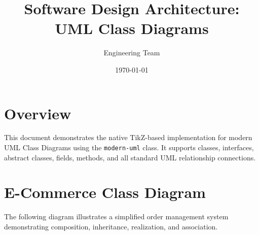 \documentclass{modern-uml}
\title{Software Design Architecture: UML Class Diagrams}
\author{Engineering Team}
\date{\today}
\begin{document}
\maketitle

\section{Overview}
This document demonstrates the native TikZ-based implementation for modern UML Class Diagrams using the \texttt{modern-uml} class. It supports classes, interfaces, abstract classes, fields, methods, and all standard UML relationship connections.

\section{E-Commerce Class Diagram}
The following diagram illustrates a simplified order management system demonstrating composition, inheritance, realization, and association.
\end{document}
